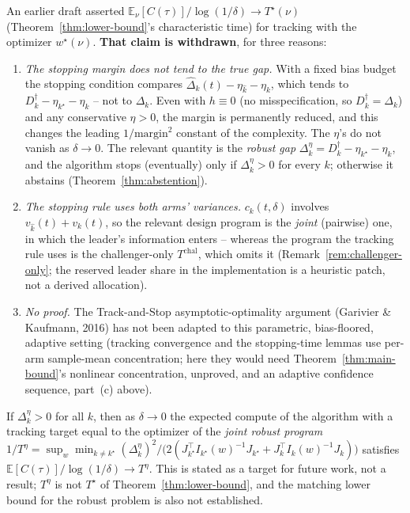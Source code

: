 An earlier draft asserted $\mathbb{E}_\nu[C(\tau)]/\log(1/\delta) \to T^\star(\nu)$ (Theorem~\ref{thm:lower-bound}'s
characteristic time) for tracking with the optimizer $w^\star(\nu)$. \textbf{That claim is
withdrawn}, for three reasons:
\begin{enumerate}
  \item \emph{The stopping margin does not tend to the true gap.} With a fixed bias budget
    the stopping condition compares $\widehat\Delta_k(t) - \eta_{\hat{k}} - \eta_k$, which tends to
    $D_k^\dagger - \eta_{k^\star} - \eta_k$ -- not to $\Delta_k$. Even with $h \equiv 0$ (no
    misspecification, so $D_k^\dagger = \Delta_k$) and any conservative $\eta > 0$, the margin is
    permanently reduced, and this changes the leading $1/\text{margin}^2$ constant of the
    complexity. The $\eta$'s do not vanish as $\delta \to 0$. The relevant quantity is the
    \emph{robust gap} $\Delta_k^{\eta} = D_k^\dagger - \eta_{k^\star} - \eta_k$, and the
    algorithm stops (eventually) only if $\Delta_k^{\eta} > 0$ for every $k$; otherwise it
    abstains (Theorem~\ref{thm:abstention}).
  \item \emph{The stopping rule uses both arms' variances.} $c_k(t,\delta)$ involves
    $v_{\hat{k}}(t) + v_k(t)$, so the relevant design program is the \emph{joint} (pairwise) one, in
    which the leader's information enters -- whereas the program the tracking rule uses is
    the challenger-only $T^{\mathrm{chal}}$, which omits it (Remark~\ref{rem:challenger-only};
    the reserved leader share in the implementation is a heuristic patch, not a
    derived allocation).
  \item \emph{No proof.} The Track-and-Stop asymptotic-optimality argument (Garivier \&
    Kaufmann, 2016) has not been adapted to this parametric, bias-floored, adaptive setting
    (tracking convergence and the stopping-time lemmas use per-arm sample-mean concentration;
    here they would need Theorem~\ref{thm:main-bound}'s nonlinear concentration, unproved,
    and an adaptive confidence sequence, part~(c) above).
\end{enumerate}

\begin{conjecture}
\label{conj:robust-time}
If $\Delta_k^{\eta} > 0$ for all $k$, then as $\delta \to 0$ the expected compute of the
algorithm with a tracking target equal to the optimizer of the \emph{joint robust program}
$1/T^{\eta} = \sup_w \min_{k \ne k^\star}
(\Delta_k^{\eta})^2 / \big(2 (J_{k^\star}^\top I_{k^\star}(w)^{-1} J_{k^\star}
+ J_k^\top I_k(w)^{-1} J_k)\big)$ satisfies $\mathbb{E}[C(\tau)]/\log(1/\delta) \to T^{\eta}$.
This is stated as a target for future work, not a result; $T^{\eta}$ is not $T^\star$ of
Theorem~\ref{thm:lower-bound}, and the matching lower bound for the robust problem is also
not established.
\end{conjecture}

